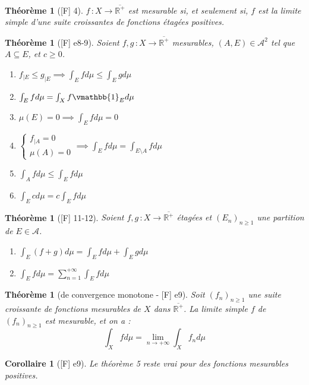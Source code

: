 \documentclass[10pt, a4paper, parskip=full, twoside, twocolumn]{report}
\newtheorem{theorem}[definition]{Théorème}
\newtheorem{corollary}[definition]{Corollaire}
\newcommand{\IR}{\mathbb{R}}
\newcommand{\A}{\mathscr{A}}
\begin{document}
\begin{theorem}[\textnormal{[F] 4}]
	$f\,\colon X\to \overline{\IR^+}$ est mesurable si, et seulement si, $f$ est la limite simple d'une suite croissantes de fonctions étagées positives.
\end{theorem}

\begin{theorem}[\textnormal{[F] e8-9}]
	Soient $f,g\,\colon X\to \overline{\IR^+}$ mesurables, $(A,E)\in \A^2$ tel que $A\subseteq E$, et $c\geq 0$.
	\begin{enumerate}
		\item $f_{\mid E} \leq g_{\mid E} \implies \int_E fd\mu \leq \int_E gd\mu$
		\item $\int_E fd\mu = \int_X f\vmathbb{1}_E d\mu$
		\item $\mu(E) = 0 \implies \int_Efd\mu = 0$
		\item $\begin{cases}
			f_{\mid A} = 0 \\ \mu(A) = 0
		\end{cases}\implies \int_E fd\mu = \int_{E\setminus A} fd\mu$
		\item $\int_A fd\mu\leq \int_E fd\mu$
		\item $\int_E cd\mu = c\int_E fd\mu$
	\end{enumerate}
\end{theorem}

\begin{theorem}[\textnormal{[F] 11-12}]
	Soient $f,g\,\colon X\to\overline{\IR^+}$ étagées et $\left(E_n\right)_{n\geq 1}$ une partition de $E\in \A$.
	\begin{enumerate}
		\item $\int_E(f+g)d\mu = \int_E fd\mu + \int_E gd\mu$
		\item $\int_E fd\mu = \sum_{n=1}^{+\infty} \int_E fd\mu$
	\end{enumerate}
\end{theorem}

\begin{theorem}[de convergence monotone - \textnormal{[F] e9}]
	Soit $\left(f_n\right)_{n\geq 1}$ une suite croissante de fonctions mesurables de $X$ dans $\overline{\IR^+}$.
	La limite simple $f$ de $\left(f_n\right)_{n\geq 1}$ est mesurable, et on a :
	$$\int_X fd\mu = \lim_{n\to +\infty}\int_X f_nd\mu$$
\end{theorem}

\begin{corollary}[\textnormal{[F] e9}]
	Le théorème 5 reste vrai pour des fonctions mesurables positives.
\end{corollary}
\end{document}

